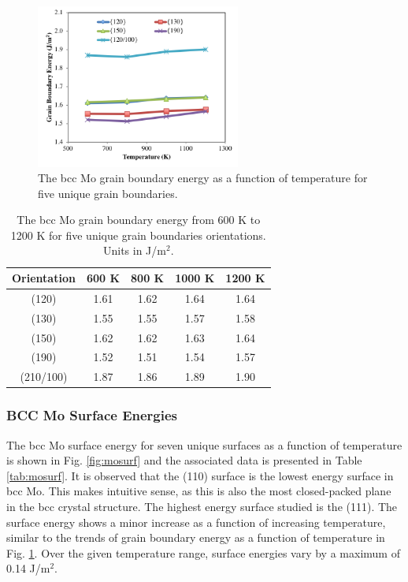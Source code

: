 \documentclass[review]{elsarticle}
\begin{document}
\begin{figure}[h]
 \centering
 \includegraphics[width=0.6\textwidth]{mo_temp.png}
 \caption{The bcc Mo grain boundary energy as a function of temperature for five unique grain boundaries.}
 \label{fig:motemp}
\end{figure}

\FloatBarrier

\begin{table}[h]
\caption{The bcc Mo grain boundary energy from 600 K to 1200 K for five unique grain boundaries orientations. Units in J/m$^{2}$. } \label{tab:motemp}
\begin{center}
\begin{tabular}{|c|c|c|c|c|}
	\hline
	Orientation & 600 K & 800 K & 1000 K & 1200 K \\
	 \hline
	 (120) & 1.61 & 1.62 & 1.64 & 1.64 \\
	 (130) & 1.55 & 1.55 & 1.57 & 1.58 \\
	 (150) & 1.62 & 1.62 & 1.63 & 1.64 \\
	 (190) & 1.52 & 1.51 & 1.54 & 1.57 \\
	 (210/100) & 1.87 & 1.86 & 1.89 & 1.90 \\	 
	 \hline
\end{tabular}
\end{center}
\label{default}
\end{table}

\FloatBarrier

\subsubsection{BCC Mo Surface Energies}

The bcc Mo surface energy for seven unique surfaces as a function of temperature is shown in Fig. \ref{fig:mosurf} and the associated data is presented in Table \ref{tab:mosurf}. It is observed that the (110) surface is the lowest energy surface in bcc Mo. This makes intuitive sense, as this is also the most closed-packed plane in the bcc crystal structure. The highest energy surface studied is the (111). The surface energy shows a minor increase as a function of increasing temperature, similar to the trends of grain boundary energy as a function of temperature in Fig. \ref{fig:motemp}. Over the given temperature range, surface energies vary by a maximum of 0.14 J/m$^{2}$.
\end{document}
